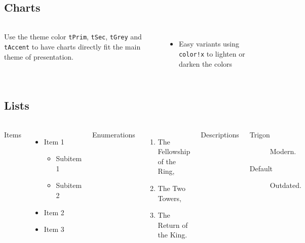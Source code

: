 \subsection{Charts}
\begin{frame}{\insertsectionhead}
  \framesubtitle{\insertsubsectionhead}
  \begin{columns}[c, onlytextwidth]
    Use the theme color \texttt{tPrim}, \texttt{tSec}, \texttt{tGrey} and
    \texttt{tAccent} to have charts directly fit the main theme of presentation.
    \vfill
    \begin{itemize}
      \item Easy variants using \texttt{color!x} to lighten or darken the colors
    \end{itemize}
    \hfill
    \center
  \end{columns}
\end{frame}

\subsection{Lists}
\begin{frame}{\insertsectionhead}
  \framesubtitle{\insertsubsectionhead}
  \begin{columns}[T,onlytextwidth]
    Items
    \begin{itemize}
      \item Item 1
        \begin{itemize}
          \item Subitem 1
          \item Subitem 2
        \end{itemize}
      \item Item 2
      \item Item 3
    \end{itemize}

    Enumerations
    \begin{enumerate}
      \item The Fellowship of the Ring,
      \item The Two Towers,
      \item The Return of the King.
    \end{enumerate}

    Descriptions
    \begin{description}
      \item[Trigon] Modern. \item[Default] Outdated.
    \end{description}
  \end{columns}
\end{frame}

